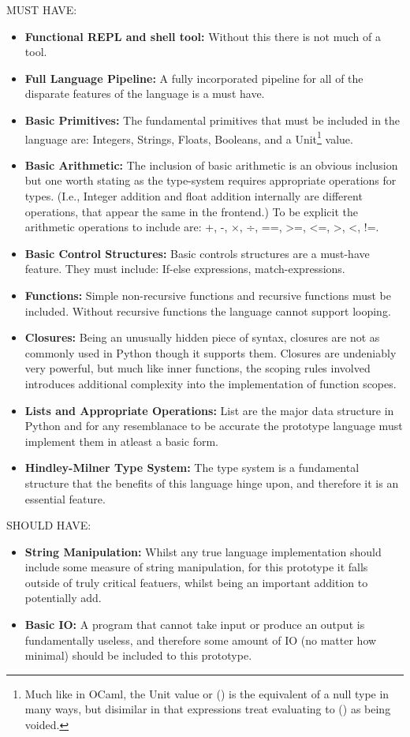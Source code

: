 \documentclass{l4proj}
\begin{document}
MUST HAVE:
\begin{itemize}
    \item \textbf{Functional REPL and shell tool:} Without this there is not much of a tool.
    \item \textbf{Full Language Pipeline:} A fully incorporated pipeline for all of the disparate features of the language is a must have.
    \item \textbf{Basic Primitives:} The fundamental primitives that must be included in the language are: Integers, Strings, Floats, Booleans, and a Unit\footnote{Much like in OCaml, the Unit value or () is the equivalent of a null type in many ways, but disimilar in that expressions treat evaluating to () as being voided.} value.
    \item \textbf{Basic Arithmetic:} The inclusion of basic arithmetic is an obvious inclusion but one worth stating as the type-system requires appropriate operations for types.
    (I.e., Integer addition and float addition internally are different operations, that appear the same in the frontend.)
    To be explicit the arithmetic operations to include are: +, -, $\times$, ÷, ==, >=, <=, >, <, !=.
    \item \textbf{Basic Control Structures:} Basic controls structures are a must-have feature. They must include: If-else expressions, match-expressions.
    \item \textbf{Functions:} Simple non-recursive functions and recursive functions must be included. Without recursive functions the language cannot support looping.
    \item \textbf{Closures:} Being an unusually hidden piece of syntax, closures are not as commonly used in Python though it supports them.
    Closures are undeniably very powerful, but much like inner functions, the scoping rules involved introduces additional complexity into the implementation of function scopes. 
    \item \textbf{Lists and Appropriate Operations:} List are the major data structure in Python and for any resemblanace to be accurate the prototype language must implement them in atleast a basic form.
    \item \textbf{Hindley-Milner Type System:} The type system is a fundamental structure that the benefits of this language hinge upon, and therefore it is an essential feature.
\end{itemize}

SHOULD HAVE:
\begin{itemize}
    \item \textbf{String Manipulation:} Whilst any true language implementation should include some measure of string manipulation, for this prototype it falls outside of truly critical featuers, whilst being an important addition to potentially add.
    \item \textbf{Basic IO:} A program that cannot take input or produce an output is fundamentally useless, and therefore some amount of IO (no matter how minimal) should be included to this prototype.
\end{itemize}
\end{document}

